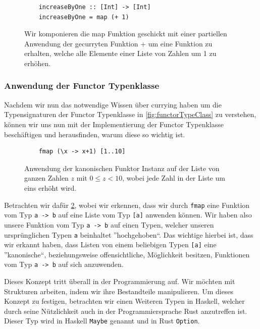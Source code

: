 \documentclass{hhuarticle}
\theoremstyle{definition}
\theoremstyle{theorem}
\begin{document}
  \begin{figure}[h]

    \begin{lstlisting}
    increaseByOne :: [Int] -> [Int]
    increaseByOne = map (+ 1)
    \end{lstlisting}
    \caption{Wir komponieren die map Funktion geschickt mit einer partiellen Anwendung der gecurryten Funktion + um eine Funktion zu erhalten, welche alle Elemente einer Liste von Zahlen um 1 zu erhöhen.}%
    \label{fig:currying1}
  \end{figure}

  \subsubsection{Anwendung der Functor Typenklasse}

  Nachdem wir nun das notwendige Wissen über currying haben um 
  die Typensignaturen der Functor Typenklasse in \cref{fig:functorTypeClass}
  zu verstehen, können wir uns nun mit der Implementierung der Functor Typenklasse
  beschäftigen und herausfinden, warum diese so wichtig ist.

  \begin{figure}[h]
    \begin{lstlisting}
    fmap (\x -> x+1) [1..10]
    \end{lstlisting}
    \caption{Anwendung der kanonischen Funktor Instanz auf der Liste von ganzen Zahlen $z$ mit $0\le z < 10$, wobei jede Zahl in der Liste um eins erhöht wird.}%
    \label{fig:fmapExample}
  \end{figure}

  Betrachten wir dafür \cref{fig:fmapExample}, wobei wir erkennen,
  dass wir durch \verb|fmap| eine Funktion vom Typ \verb|a -> b| auf
  eine Liste vom Typ \verb|[a]| anwenden können. Wir haben also unsere
  Funktion vom Typ \verb|a -> b| auf einen Typen, welcher unseren
  ursprünglichen Typen \verb|a| beinhaltet ''hochgehoben``.
  Das wichtige hierbei ist, dass wir erkannt haben, dass Listen von einem
  beliebigen Typen \verb|[a]| eine ''kanonische``, beziehungsweise offensichtliche,
  Möglichkeit besitzen, Funktionen vom Typ \verb|a -> b| auf sich anzuwenden.

  Dieses Konzept tritt überall in der Programmierung auf. Wir möchten
  mit Strukturen arbeiten, indem wir ihre Bestandteile manipulieren.
  Um dieses Konzept zu festigen, betrachten wir einen Weiteren Typen in
  Haskell, welcher durch seine Nützlichkeit auch in der Programmiersprache
  Rust anzutreffen ist. Dieser Typ wird in Haskell \verb|Maybe| genannt
  und in Rust \verb|Option|.
\end{document}
